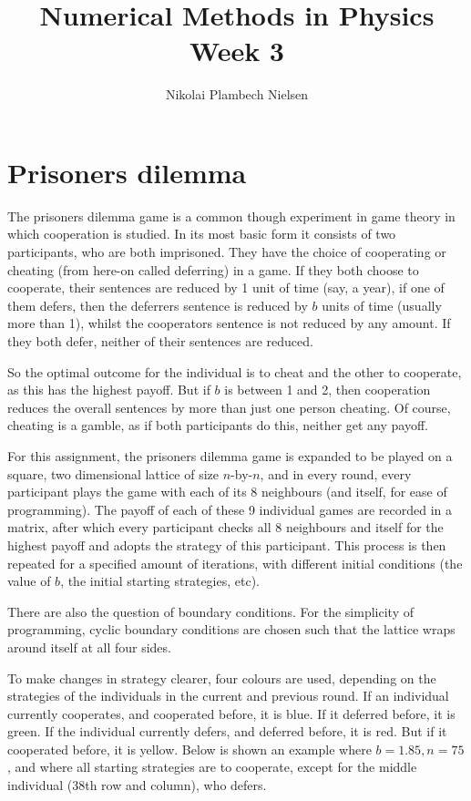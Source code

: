 \documentclass[a4paper,10pt]{article} 	%
\title{Numerical Methods in Physics Week 3}
\author{Nikolai Plambech Nielsen}
\date{}
\numberwithin{equation}{section}
\begin{document}
	\maketitle
	\section{Prisoners dilemma}
	The prisoners dilemma game is a common though experiment in game theory in which cooperation is studied. In its most basic form it consists of two participants, who are both imprisoned. They have the choice of cooperating or cheating (from here-on called deferring) in a game. If they both choose to cooperate, their sentences are reduced by 1 unit of time (say, a year), if one of them defers, then the deferrers sentence is reduced by $ b $ units of time (usually more than 1), whilst the cooperators sentence is not reduced by any amount. If they both defer, neither of their sentences are reduced.
	
	So the optimal outcome for the individual is to cheat and the other to cooperate, as this has the highest payoff. But if $ b $ is between 1 and 2, then cooperation reduces the overall sentences by more than just one person cheating. Of course, cheating is a gamble, as if both participants do this, neither get any payoff.
	
	For this assignment, the prisoners dilemma game is expanded to be played on a square, two dimensional lattice of size $ n $-by-$ n $, and in every round, every participant plays the game with each of its 8 neighbours (and itself, for ease of programming). The payoff of each of these 9 individual games are recorded in a matrix, after which every participant checks all 8 neighbours and itself for the highest payoff and adopts the strategy of this participant. This process is then repeated for a specified amount of iterations, with different initial conditions (the value of $ b $, the initial starting strategies, etc).
	
	There are also the question of boundary conditions. For the simplicity of programming, cyclic boundary conditions are chosen such that the lattice wraps around itself at all four sides. 
	
	To make changes in strategy clearer, four colours are used, depending on the strategies of the individuals in the current and previous round. If an individual currently cooperates, and cooperated before, it is blue. If it deferred before, it is green. If the individual currently defers, and deferred before, it is red. But if it cooperated before, it is yellow. Below is shown an example where $ b = 1.85, n=75 $, and where all starting strategies are to cooperate, except for the middle individual (38th row and column), who defers.
	
\end{document}
